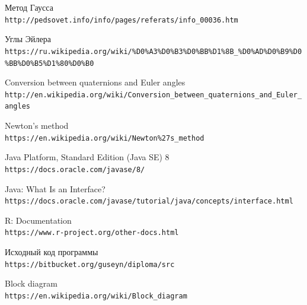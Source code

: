 \documentclass[14pt]{extreport}
\begin{document}
\begin{thebibliography}{9}
Метод Гаусса
\\\texttt{\small{http://pedsovet.info/info/pages/referats/info\_00036.htm}}

Углы Эйлера
\\\texttt{\footnotesize {https://ru.wikipedia.org/wiki/\%D0\%A3\%D0\%B3\%D0\%BB\%D1\%8B\_\%D0\%AD\%D0\%B9\%D0\%BB\%D0\%B5\%D1\%80\%D0\%B0}}

Conversion between quaternions and Euler angles
\\\texttt{\small{http://en.wikipedia.org/wiki/Conversion\_between\_quaternions\_and\_Euler\_angles}}

Newton's method
\\\texttt{\small{https://en.wikipedia.org/wiki/Newton\%27s\_method}}

Java Platform, Standard Edition (Java SE) 8
\\\texttt{\small{https://docs.oracle.com/javase/8/}}

Java: What Is an Interface?
\\\texttt{\small{https://docs.oracle.com/javase/tutorial/java/concepts/interface.html}}

R: Documentation
\\\texttt{\small{https://www.r-project.org/other-docs.html}}

Исходный код программы
\\\texttt{\small{https://bitbucket.org/guseyn/diploma/src}}

Block diagram
\\\texttt{\small{https://en.wikipedia.org/wiki/Block\_diagram}}


\end{thebibliography}
\end{document}
